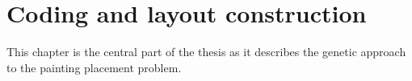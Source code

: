 \chapter{Coding and layout construction}\label{ch:coding-and-layout-construction}

This chapter is the central part of the thesis as it describes the genetic approach to the painting placement problem.





